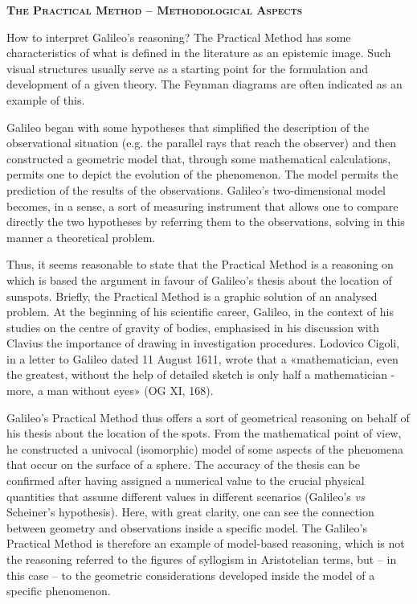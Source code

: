\documentclass[a4paper]{article}
\begin{document}
{\centering\bfseries\scshape
The Practical Method – Methodological Aspects
\par}

How to interpret Galileo’s reasoning? The Practical Method has some characteristics of what is defined in the literature
as an epistemic image. Such visual structures usually serve as a starting point for the formulation and development of
a given theory. The Feynman diagrams are often indicated as an example of this.

Galileo began with some hypotheses that simplified the description of the observational situation (e.g. the parallel
rays that reach the observer) and then constructed a geometric model that, through some mathematical calculations,
permits one to depict the evolution of the phenomenon. The model permits the prediction of the results of the
observations. Galileo’s two-dimensional model becomes, in a sense, a sort of measuring instrument that allows one to
compare directly the two hypotheses by referring them to the observations, solving in this manner a theoretical
problem. 

Thus, it seems reasonable to state that the Practical Method is a reasoning on which is based the argument in favour of
Galileo’s thesis about the location of sunspots. Briefly, the Practical Method is a graphic solution of an analysed
problem. At the beginning of his scientific career, Galileo, in the context of his studies on the centre of gravity of
bodies, emphasised in his discussion with Clavius the importance of drawing in investigation procedures. Lodovico
Cigoli, in a letter to Galileo dated 11 August 1611, wrote that a «mathematician, even the greatest, without the help
of detailed sketch is only half a mathematician - more, a man without eyes» (OG XI, 168).

Galileo’s Practical Method thus offers a sort of geometrical reasoning on behalf of his thesis about the location of the
spots. From the mathematical point of view, he constructed a univocal (isomorphic) model of some aspects of the
phenomena that occur on the surface of a sphere. The accuracy of the thesis can be confirmed after having assigned a
numerical value to the crucial physical quantities that assume different values in different scenarios (Galileo’s
\textit{vs} Scheiner’s hypothesis). Here, with great clarity, one can see the connection between geometry and
observations inside a specific model. The Galileo’s Practical Method is therefore an example of model-based reasoning,
which is not the reasoning referred to the figures of syllogism in Aristotelian terms, but – in this case – to the
geometric considerations developed inside the model of a specific phenomenon. 
\end{document}
